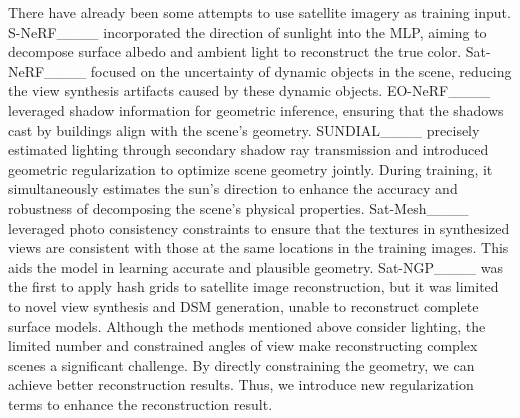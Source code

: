 There have already been some attempts to use satellite imagery as training input. S-NeRF____ incorporated the direction of sunlight into the MLP, aiming to decompose surface albedo and ambient light to reconstruct the true color. Sat-NeRF____ focused on the uncertainty of dynamic objects in the scene, reducing the view synthesis artifacts caused by these dynamic objects. EO-NeRF____ leveraged shadow information for geometric inference, ensuring that the shadows cast by buildings align with the scene's geometry. SUNDIAL____ precisely estimated lighting through secondary shadow ray transmission and introduced geometric regularization to optimize scene geometry jointly. During training, it simultaneously estimates the sun's direction to enhance the accuracy and robustness of decomposing the scene's physical properties. Sat-Mesh____ leveraged photo consistency constraints to ensure that the textures in synthesized views are consistent with those at the same locations in the training images. This aids the model in learning accurate and plausible geometry. Sat-NGP____ was the first to apply hash grids to satellite image reconstruction, but it was limited to novel view synthesis and DSM generation, unable to reconstruct complete surface models. Although the methods mentioned above consider lighting, the limited number and constrained angles of view make reconstructing complex scenes a significant challenge. By directly constraining the geometry, we can achieve better reconstruction results. Thus, we introduce new regularization terms to enhance the reconstruction result.
